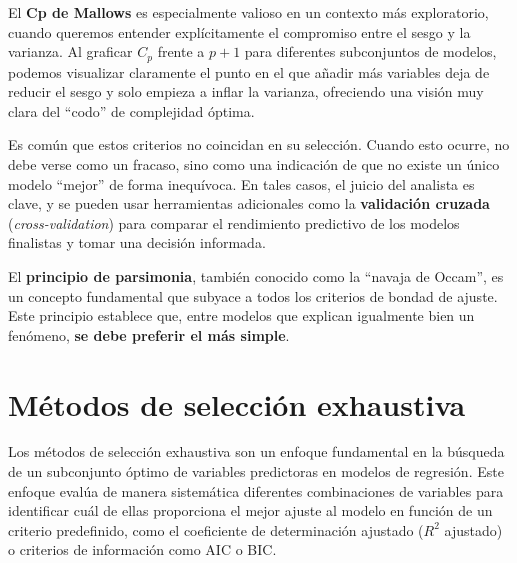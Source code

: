 \documentclass[
  letterpaper,
  DIV=11,
  numbers=noendperiod]{scrreprt}
\begin{document}
El \textbf{Cp de Mallows} es especialmente valioso en un contexto más
exploratorio, cuando queremos entender explícitamente el compromiso
entre el sesgo y la varianza. Al graficar \(C_p\) frente a \(p+1\) para
diferentes subconjuntos de modelos, podemos visualizar claramente el
punto en el que añadir más variables deja de reducir el sesgo y solo
empieza a inflar la varianza, ofreciendo una visión muy clara del
``codo'' de complejidad óptima.

Es común que estos criterios no coincidan en su selección. Cuando esto
ocurre, no debe verse como un fracaso, sino como una indicación de que
no existe un único modelo ``mejor'' de forma inequívoca. En tales casos,
el juicio del analista es clave, y se pueden usar herramientas
adicionales como la \textbf{validación cruzada}
(\emph{cross-validation}) para comparar el rendimiento predictivo de los
modelos finalistas y tomar una decisión informada.

\begin{tcolorbox}[enhanced jigsaw, breakable, toprule=.15mm, bottomtitle=1mm, coltitle=black, colbacktitle=quarto-callout-important-color!10!white, titlerule=0mm, opacitybacktitle=0.6, bottomrule=.15mm, toptitle=1mm, title=\textcolor{quarto-callout-important-color}{\faExclamation}\hspace{0.5em}{El Principio de Parsimonia en la Selección de Modelos}, arc=.35mm, rightrule=.15mm, opacityback=0, colframe=quarto-callout-important-color-frame, leftrule=.75mm, left=2mm, colback=white]

El \textbf{principio de parsimonia}, también conocido como la ``navaja
de Occam'', es un concepto fundamental que subyace a todos los criterios
de bondad de ajuste. Este principio establece que, entre modelos que
explican igualmente bien un fenómeno, \textbf{se debe preferir el más
simple}.

\end{tcolorbox}

\section{Métodos de selección
exhaustiva}\label{muxe9todos-de-selecciuxf3n-exhaustiva}

Los métodos de selección exhaustiva son un enfoque fundamental en la
búsqueda de un subconjunto óptimo de variables predictoras en modelos de
regresión. Este enfoque evalúa de manera sistemática diferentes
combinaciones de variables para identificar cuál de ellas proporciona el
mejor ajuste al modelo en función de un criterio predefinido, como el
coeficiente de determinación ajustado (\(R^2\) ajustado) o criterios de
información como AIC o BIC.
\end{document}
